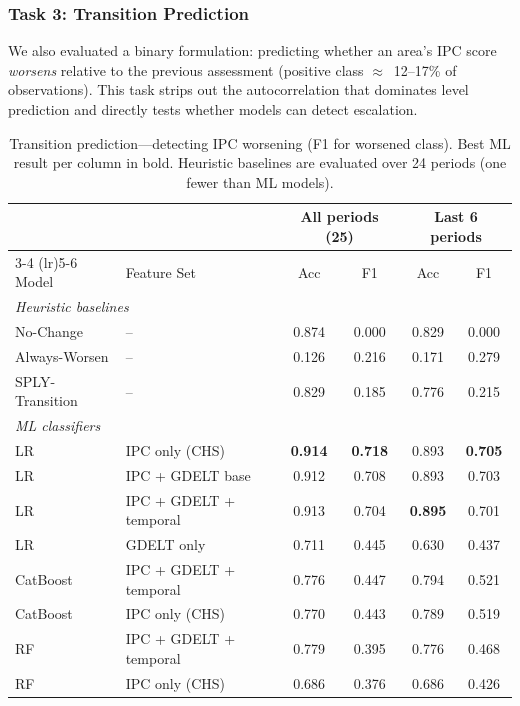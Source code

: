 \documentclass{article}
\begin{document}
\subsubsection{Task 3: Transition Prediction}

We also evaluated a binary formulation: predicting whether an area's IPC score \textit{worsens} relative to the previous assessment (positive class $\approx$~12--17\% of observations). This task strips out the autocorrelation that dominates level prediction and directly tests whether models can detect escalation.

\begin{table}[H]
\centering
\small
\caption{Transition prediction---detecting IPC worsening (F1 for worsened class). Best ML result per column in bold. Heuristic baselines are evaluated over 24 periods (one fewer than ML models).}
\label{tab:transitions}
\begin{tabular}{ll cccc}
\toprule
& & \multicolumn{2}{c}{All periods (25)} & \multicolumn{2}{c}{Last 6 periods} \\
\cmidrule(lr){3-4} \cmidrule(lr){5-6}
Model & Feature Set & Acc & F1 & Acc & F1 \\
\midrule
\multicolumn{6}{l}{\textit{Heuristic baselines}} \\
No-Change & -- & 0.874 & 0.000 & 0.829 & 0.000 \\
Always-Worsen & -- & 0.126 & 0.216 & 0.171 & 0.279 \\
SPLY-Transition & -- & 0.829 & 0.185 & 0.776 & 0.215 \\
\midrule
\multicolumn{6}{l}{\textit{ML classifiers}} \\
LR & IPC only (CHS) & \textbf{0.914} & \textbf{0.718} & 0.893 & \textbf{0.705} \\
LR & IPC + GDELT base & 0.912 & 0.708 & 0.893 & 0.703 \\
LR & IPC + GDELT + temporal & 0.913 & 0.704 & \textbf{0.895} & 0.701 \\
LR & GDELT only & 0.711 & 0.445 & 0.630 & 0.437 \\
CatBoost & IPC + GDELT + temporal & 0.776 & 0.447 & 0.794 & 0.521 \\
CatBoost & IPC only (CHS) & 0.770 & 0.443 & 0.789 & 0.519 \\
RF & IPC + GDELT + temporal & 0.779 & 0.395 & 0.776 & 0.468 \\
RF & IPC only (CHS) & 0.686 & 0.376 & 0.686 & 0.426 \\
\bottomrule
\end{tabular}
\end{table}
\end{document}
